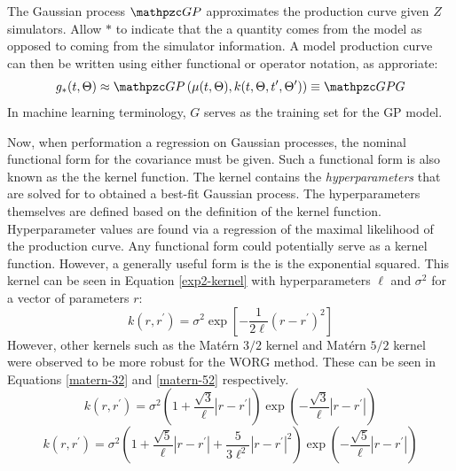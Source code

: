 The Gaussian process $\GP$ approximates the production curve 
given $Z$ simulators. Allow $*$ to indicate that the a quantity comes from 
the model as opposed to coming from the simulator information. A model 
production curve can then be written using either functional or operator
notation, as approriate:
\begin{equation}
\label{gp-def-approx}
g_*(t, \Theta) \approx \GP\left(\mu(t, \Theta), 
                                 k(t, \Theta, t^\prime, \Theta^\prime)\right) 
                \equiv \GP G
\end{equation}
In machine learning terminology, $G$ serves as the training set for the 
GP model.

Now, when performation a regression on Gaussian processes, 
the nominal functional form for the covariance must be given. 
Such a functional form is also known as the the kernel function.
The kernel contains the \emph{hyperparameters} that are solved for to 
obtained a best-fit Gaussian process. The hyperparameters themselves are
defined based on the definition of the kernel function. Hyperparameter 
values are found via a regression of the maximal likelihood of 
the production curve. Any functional form could potentially serve as a kernel
function. However, a generally useful form is the is the exponential 
squared. This kernel can be seen in Equation \ref{exp2-kernel} with 
hyperparameters $\ell$ and $\sigma^2$ for a vector of parameters $r$:
\begin{equation}
\label{exp2-kernel}
k(r, r^\prime) = \sigma^2 \exp\left[-\frac{1}{2\ell}(r - r^\prime)^2 \right]
\end{equation}
However, other kernels such as the Mat\'ern $3/2$ kernel and Mat\'ern $5/2$
kernel \cite{paciorek2004nonstationary} were observed to be more robust for 
the WORG method. These can be seen in Equations \ref{matern-32} and 
\ref{matern-52} respectively.
\begin{equation}
\label{matern-32}
k(r, r^\prime) = \sigma^2 
                 \left(1 + \frac{\sqrt{3}}{\ell}|r - r^\prime|\right)
                 \exp\left(-\frac{\sqrt{3}}{\ell}|r - r^\prime|\right)
\end{equation}
\begin{equation}
\label{matern-52}
k(r, r^\prime) = \sigma^2 
                 \left(1 + \frac{\sqrt{5}}{\ell}|r - r^\prime|
                         + \frac{5}{3\ell^2}|r - r^\prime|^2\right)
                 \exp\left(-\frac{\sqrt{5}}{\ell}|r - r^\prime|\right)
\end{equation}

